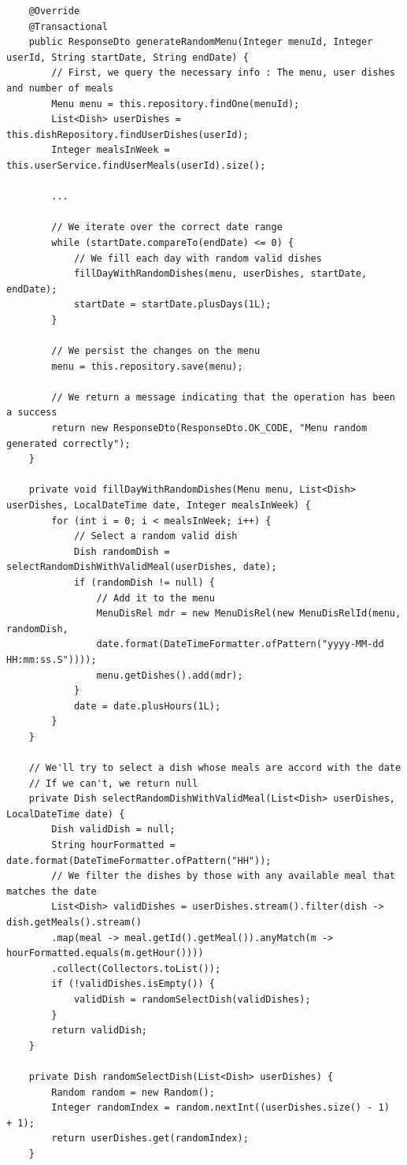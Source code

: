 \documentclass[12pt, a4paper, twoside]{book}
\begin{document}
	\begin{lstlisting}
	@Override
	@Transactional
	public ResponseDto generateRandomMenu(Integer menuId, Integer userId, String startDate, String endDate) {
		// First, we query the necessary info : The menu, user dishes and number of meals
		Menu menu = this.repository.findOne(menuId);	
		List<Dish> userDishes = this.dishRepository.findUserDishes(userId);
		Integer mealsInWeek = this.userService.findUserMeals(userId).size();
	
		...
	
		// We iterate over the correct date range
		while (startDate.compareTo(endDate) <= 0) {
			// We fill each day with random valid dishes
			fillDayWithRandomDishes(menu, userDishes, startDate, endDate);
			startDate = startDate.plusDays(1L);
		}	
	
		// We persist the changes on the menu
		menu = this.repository.save(menu);
		
		// We return a message indicating that the operation has been a success
		return new ResponseDto(ResponseDto.OK_CODE, "Menu random generated correctly");
	}
	
	private void fillDayWithRandomDishes(Menu menu, List<Dish> userDishes, LocalDateTime date, Integer mealsInWeek) {
		for (int i = 0; i < mealsInWeek; i++) {
			// Select a random valid dish
			Dish randomDish = selectRandomDishWithValidMeal(userDishes, date);
			if (randomDish != null) {
				// Add it to the menu
				MenuDisRel mdr = new MenuDisRel(new MenuDisRelId(menu, randomDish,
				date.format(DateTimeFormatter.ofPattern("yyyy-MM-dd HH:mm:ss.S"))));
				menu.getDishes().add(mdr);
			}
			date = date.plusHours(1L);
		}
	}
	
	// We'll try to select a dish whose meals are accord with the date
	// If we can't, we return null
	private Dish selectRandomDishWithValidMeal(List<Dish> userDishes, LocalDateTime date) {
		Dish validDish = null;
		String hourFormatted = date.format(DateTimeFormatter.ofPattern("HH"));
		// We filter the dishes by those with any available meal that matches the date
		List<Dish> validDishes = userDishes.stream().filter(dish -> dish.getMeals().stream()
		.map(meal -> meal.getId().getMeal()).anyMatch(m -> hourFormatted.equals(m.getHour())))
		.collect(Collectors.toList());
		if (!validDishes.isEmpty()) {
			validDish = randomSelectDish(validDishes);
		}
		return validDish;
	}
	
	private Dish randomSelectDish(List<Dish> userDishes) {
		Random random = new Random();
		Integer randomIndex = random.nextInt((userDishes.size() - 1)  + 1);
		return userDishes.get(randomIndex);
	}
	\end{lstlisting}
	
\end{document}
